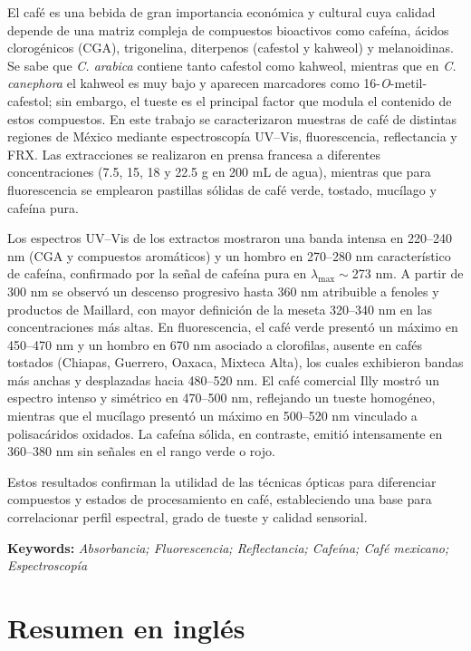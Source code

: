 \documentclass{article}
\newcommand{\keywords}[1]{%
  \par\smallskip\noindent\textbf{Keywords:} \textit{#1}\par
}
\begin{document}
\begin{abstractbox}[title=\textbf{Resumen}]
El café es una bebida de gran importancia económica y cultural cuya calidad depende de una matriz compleja de compuestos bioactivos como cafeína, ácidos clorogénicos (CGA), trigonelina, diterpenos (cafestol y kahweol) y melanoidinas. Se sabe que \textit{C. arabica} contiene tanto cafestol como kahweol, mientras que en \textit{C. canephora} el kahweol es muy bajo y aparecen marcadores como 16-\textit{O}-metil-cafestol; sin embargo, el tueste es el principal factor que modula el contenido de estos compuestos. En este trabajo se caracterizaron muestras de café de distintas regiones de México mediante espectroscopía UV–Vis, fluorescencia, reflectancia y FRX. Las extracciones se realizaron en prensa francesa a diferentes concentraciones (7.5, 15, 18 y 22.5 g en 200 mL de agua), mientras que para fluorescencia se emplearon pastillas sólidas de café verde, tostado, mucílago y cafeína pura.  

Los espectros UV–Vis de los extractos mostraron una banda intensa en 220--240 nm (CGA y compuestos aromáticos) y un hombro en 270--280 nm característico de cafeína, confirmado por la señal de cafeína pura en $\lambda_{\max}\sim$273 nm. A partir de 300 nm se observó un descenso progresivo hasta 360 nm atribuible a fenoles y productos de Maillard, con mayor definición de la meseta 320--340 nm en las concentraciones más altas. En fluorescencia, el café verde presentó un máximo en 450--470 nm y un hombro en 670 nm asociado a clorofilas, ausente en cafés tostados (Chiapas, Guerrero, Oaxaca, Mixteca Alta), los cuales exhibieron bandas más anchas y desplazadas hacia 480--520 nm. El café comercial Illy mostró un espectro intenso y simétrico en 470--500 nm, reflejando un tueste homogéneo, mientras que el mucílago presentó un máximo en 500--520 nm vinculado a polisacáridos oxidados. La cafeína sólida, en contraste, emitió intensamente en 360--380 nm sin señales en el rango verde o rojo.  

Estos resultados confirman la utilidad de las técnicas ópticas para diferenciar compuestos y estados de procesamiento en café, estableciendo una base para correlacionar perfil espectral, grado de tueste y calidad sensorial.
\end{abstractbox}

\keywords{Absorbancia; Fluorescencia; Reflectancia; Cafeína; Café mexicano; Espectroscopía}

\section{Resumen en inglés}
\end{document}
